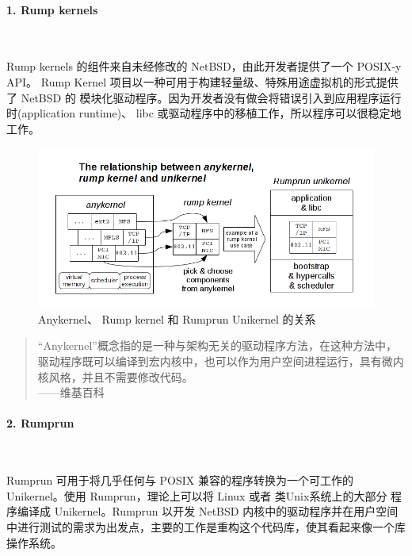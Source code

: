 \documentclass{../runikraft-report}
\begin{document}
\paragraph{1. Rump kernels}~

Rump kernels 的组件来自未经修改的 NetBSD，由此开发者提供了一个 POSIX-y API。
Rump Kernel 项目以一种可用于构建轻量级、特殊用途虚拟机的形式提供了 NetBSD 的
模块化驱动程序。因为开发者没有做会将错误引入到应用程序运行时(application runtime)、
libc 或驱动程序中的移植工作，所以程序可以很稳定地工作。\cite{bib:21-rump-kernel}
\begin{figure}[!hbt]
\includegraphics[width=\linewidth]{assets/rumprun-1.png}
\caption{Anykernel、
Rump kernel 和 Rumprun Unikernel 的关系}
\end{figure}

\begin{quote}
“Anykernel”概念指的是一种与架构无关的驱动程序方法，在这种方法中，驱动程序既可以编译到宏内核中，也可以作为用户空间进程运行，具有微内核风格，并且不需要修改代码。\\
\hspace*{\fill}——维基百科
\end{quote}

\paragraph{2. Rumprun}~

Rumprun 可用于将几乎任何与 POSIX 兼容的程序转换为一个可工作的
Unikernel。使用 Rumprun，理论上可以将 Linux 或者 类Unix系统上的大部分
程序编译成 Unikernel。Rumprun 以开发 NetBSD 内核中的驱动程序并在用户空间
中进行测试的需求为出发点，主要的工作是重构这个代码库，使其看起来像一个库操作系统。\cite{bib:24-rumrun}
\end{document}
